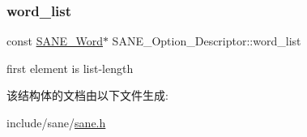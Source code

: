 \subsubsection{\texorpdfstring{word\+\_\+list}{word\_list}}
{\footnotesize\ttfamily const \hyperlink{sane_8h_aa65d63e57d37984b9d873811a7544b4a}{S\+A\+N\+E\+\_\+\+Word}$\ast$ S\+A\+N\+E\+\_\+\+Option\+\_\+\+Descriptor\+::word\+\_\+list}

first element is list-\/length 

该结构体的文档由以下文件生成\+:\begin{DoxyCompactItemize}
\item 
include/sane/\hyperlink{sane_8h}{sane.\+h}\end{DoxyCompactItemize}

